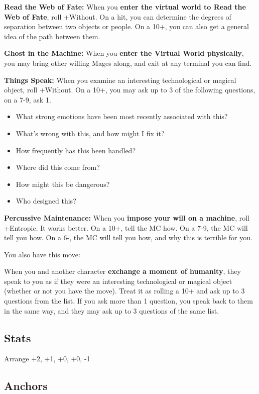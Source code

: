 \documentclass[
  oneside,
  statementpaper,
  9pt]{memoir}
\begin{document}
\textbf{Read the Web of Fate:} When you \textbf{enter the virtual world
to Read the Web of Fate}, roll +Without. On a hit, you can determine the
degrees of separation between two objects or people. On a 10+, you can
also get a general idea of the path between them.

\textbf{Ghost in the Machine:} When you \textbf{enter the Virtual World
physically}, you may bring other willing Mages along, and exit at any
terminal you can find.

\textbf{Things Speak:} When you examine an interesting technological or
magical object, roll +Without. On a 10+, you may ask up to 3 of the
following questions, on a 7-9, ask 1.

\begin{itemize}
\tightlist
\item
  What strong emotions have been most recently associated with this?
\item
  What's wrong with this, and how might I fix it?
\item
  How frequently has this been handled?
\item
  Where did this come from?
\item
  How might this be dangerous?
\item
  Who designed this?
\end{itemize}

\textbf{Percussive Maintenance:} When you \textbf{impose your will on a
machine}, roll +Entropic. It works better. On a 10+, tell the MC how. On
a 7-9, the MC will tell you how. On a 6-, the MC will tell you how, and
why this is terrible for you.

You also have this move:

When you and another character \textbf{exchange a moment of humanity},
they speak to you as if they were an interesting technological or
magical object (whether or not you have the move). Treat it as rolling a
10+ and ask up to 3 questions from the list. If you ask more than 1
question, you speak back to them in the same way, and they may ask up to
3 questions of the same list.

\hypertarget{stats-7}{%
\subsection{Stats}\label{stats-7}}

Arrange +2, +1, +0, +0, -1

\hypertarget{anchors-6}{%
\subsection{Anchors}\label{anchors-6}}
\end{document}

